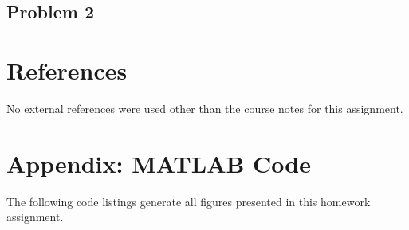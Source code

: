 \documentclass[12pt]{article}
\begin{document}
\subsection{Problem 2}

\section{References} %

No external references were used other than the course notes for this assignment.

\section*{Appendix: MATLAB Code} %

The following code listings generate all figures presented in this homework assignment.


\end{document}
